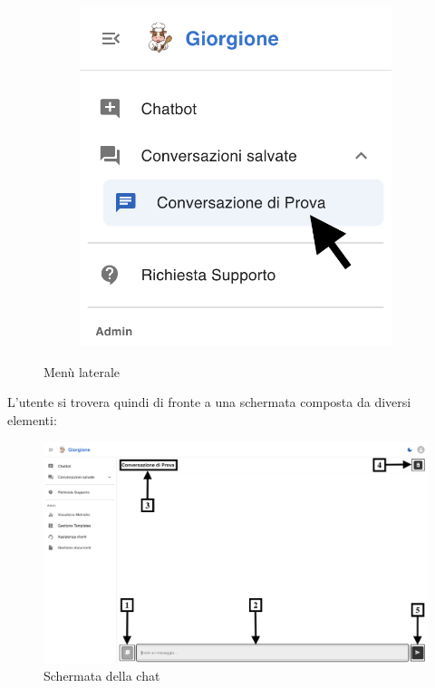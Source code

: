 \begin{figure}[h!]
\begin{subfigure}{0.3\textwidth}
        \includegraphics[width=\textwidth]{./img/laterale2.png}
    \end{subfigure}
    \caption{Menù laterale}
\end{figure}
L'utente si trovera quindi di fronte a una schermata composta da diversi elementi:
\begin{figure}[h!]
    \centering
    \includegraphics[width=\textwidth]{./img/SchermataChat1.png}
    \caption{Schermata della chat}
    \label{fig:schermata-chat}
\end{figure}
\\
